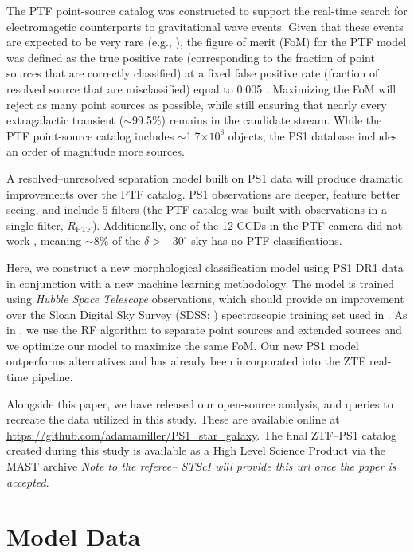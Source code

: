 \documentclass[twocolumn]{aastex62}
\begin{document}
\begin{CJK*}{UTF8}{gbsn}
The PTF point-source catalog was constructed to support the real-time search
for electromagetic counterparts to gravitational wave events. Given that
these events are expected to be very rare (e.g., \citealt{Scolnic18}), the
figure of merit (FoM) for the PTF model was defined as the true positive
rate (corresponding to the fraction of point sources that are correctly
classified) at a fixed false positive rate (fraction of resolved source that
are misclassified) equal to 0.005 \citep{Miller17}. Maximizing the FoM will
reject as many point sources as possible, while still ensuring that nearly
every extragalactic transient ($\sim$99.5\%) remains in the candidate
stream. While the PTF point-source catalog includes $\sim$1.7$\times 10^8$
objects, the PS1 database includes an order of magnitude more sources.

A resolved--unresolved separation model built on PS1 data will produce
dramatic improvements over the PTF catalog. PS1 observations are deeper,
feature better seeing, and include 5 filters (the PTF catalog was built with
observations in a single filter, $R_\mathrm{PTF}$). Additionally, one of the
12 CCDs in the PTF camera did not work \citep{Law09}, meaning $\sim$8\% of
the $\delta > -30^\circ$ sky has no PTF classifications.

Here, we construct a new morphological classification model using PS1 DR1
data in conjunction with a new machine learning methodology. The model is
trained using \textit{Hubble Space Telescope} observations, which should
provide an improvement over the Sloan Digital Sky Survey (SDSS;
\citealt{York00}) spectroscopic training set used in \citet{Miller17}. As in
\citet{Miller17}, we use the RF algorithm to separate point sources and
extended sources and we optimize our model to maximize the same FoM. Our new
PS1 model outperforms alternatives and has already been incorporated into
the ZTF real-time pipeline. 

Alongside this paper, we have released our open-source analysis, and queries
to recreate the data utilized in this study. These are available online at
\url{https://github.com/adamamiller/PS1_star_galaxy}. The final ZTF--PS1 catalog
created during this study is available as a High Level Science Product via
the MAST archive \textit{Note to the referee-- STScI will provide this url
once the paper is accepted}.

\section{Model Data}\label{sec:model_data}


\end{CJK*}
\end{document}
